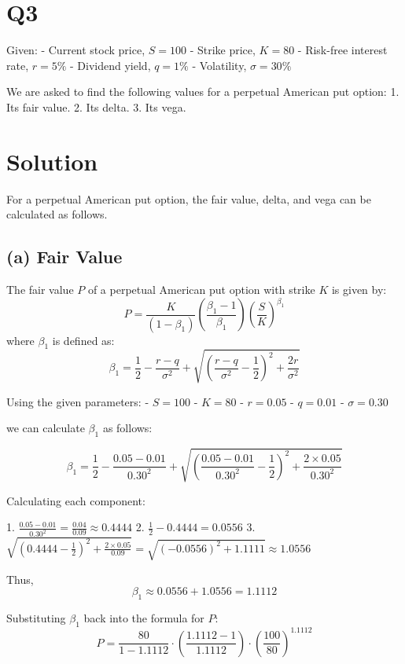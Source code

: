 \documentclass{article}
\begin{document}
\newpage


\section*{\textbf{Q3}}

Given:
- Current stock price, \( S = 100 \)
- Strike price, \( K = 80 \)
- Risk-free interest rate, \( r = 5\% \)
- Dividend yield, \( q = 1\% \)
- Volatility, \( \sigma = 30\% \)

We are asked to find the following values for a perpetual American put option:
1. Its fair value.
2. Its delta.
3. Its vega.

\section{\textbf{Solution}}

For a perpetual American put option, the fair value, delta, and vega can be calculated as follows.

\subsection{\textbf{(a) Fair Value}}

The fair value \( P \) of a perpetual American put option with strike \( K \) is given by:
\[
P = \frac{K}{(1 - \beta_1)} \left(\frac{\beta_1 - 1}{\beta_1}\right) \left(\frac{S}{K}\right)^{\beta_1}
\]
where \( \beta_1 \) is defined as:
\[
\beta_1 = \frac{1}{2} - \frac{r - q}{\sigma^2} + \sqrt{\left(\frac{r - q}{\sigma^2} - \frac{1}{2}\right)^2 + \frac{2r}{\sigma^2}}
\]

Using the given parameters:
- \( S = 100 \)
- \( K = 80 \)
- \( r = 0.05 \)
- \( q = 0.01 \)
- \( \sigma = 0.30 \)

we can calculate \( \beta_1 \) as follows:

\[
\beta_1 = \frac{1}{2} - \frac{0.05 - 0.01}{0.30^2} + \sqrt{\left(\frac{0.05 - 0.01}{0.30^2} - \frac{1}{2}\right)^2 + \frac{2 \times 0.05}{0.30^2}}
\]

Calculating each component:

1. \(\frac{0.05 - 0.01}{0.30^2} = \frac{0.04}{0.09} \approx 0.4444\)
2. \(\frac{1}{2} - 0.4444 = 0.0556\)
3. \(\sqrt{\left(0.4444 - \frac{1}{2}\right)^2 + \frac{2 \times 0.05}{0.09}} = \sqrt{(-0.0556)^2 + 1.1111} \approx 1.0556\)

Thus,
\[
\beta_1 \approx 0.0556 + 1.0556 = 1.1112
\]

Substituting \( \beta_1 \) back into the formula for \( P \):
\[
P = \frac{80}{1 - 1.1112} \cdot \left(\frac{1.1112 - 1}{1.1112}\right) \cdot \left(\frac{100}{80}\right)^{1.1112}
\]
\end{document}
